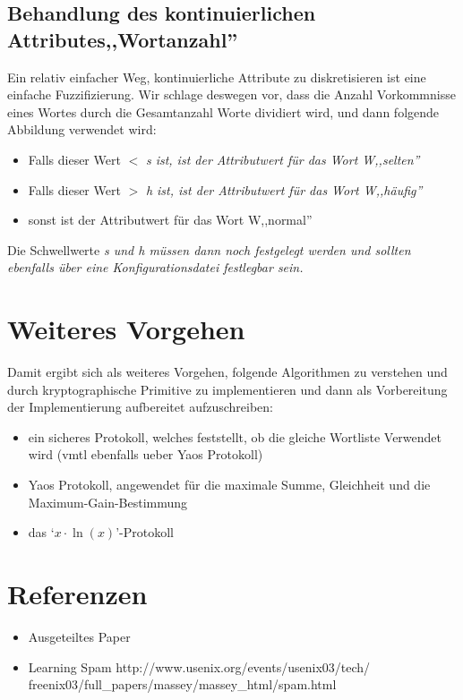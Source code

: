 \documentclass[12pt]{article}
\begin{document}
\subsection{Behandlung des kontinuierlichen Attributes,,Wortanzahl''}
Ein relativ einfacher Weg, kontinuierliche Attribute zu diskretisieren ist eine
einfache Fuzzifizierung. Wir schlage deswegen vor, dass die Anzahl Vorkommnisse
eines Wortes durch die Gesamtanzahl Worte dividiert wird, und dann folgende
Abbildung verwendet wird:
\begin{itemize}
 \item Falls dieser Wert \(<\) \em{s} ist, ist der Attributwert f\"ur das Wort W,,selten''
 \item Falls dieser Wert \(>\) \em{h} ist, ist der Attributwert f\"ur das Wort W,,h\"aufig''
 \item sonst ist der Attributwert f\"ur das Wort W,,normal''
\end{itemize}
Die Schwellwerte \em{s} und \em{h} m\"ussen dann noch festgelegt werden und
sollten ebenfalls \"uber eine Konfigurationsdatei festlegbar sein.

\section{Weiteres Vorgehen}
Damit ergibt sich als weiteres Vorgehen, folgende Algorithmen zu verstehen
und durch kryptographische Primitive zu implementieren und dann als Vorbereitung
der Implementierung aufbereitet aufzuschreiben:
\begin{itemize}
 \item ein sicheres Protokoll, welches feststellt, ob die gleiche Wortliste
       Verwendet wird (vmtl ebenfalls ueber Yaos Protokoll)
 \item Yaos Protokoll, angewendet f\"ur die maximale Summe, Gleichheit und 
   die Maximum-Gain-Bestimmung
 \item das `\(x \cdot \ln (x)\)'-Protokoll
\end{itemize}

\section{Referenzen}
\begin{itemize}
\item Ausgeteiltes Paper
\item Learning Spam http://www.usenix.org/events/usenix03/tech/\\
      freenix03/full\_papers/massey/massey\_html/spam.html
\end{itemize}
\end{document}
